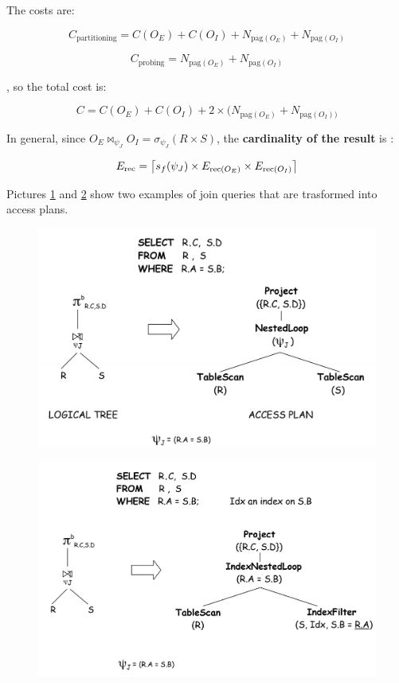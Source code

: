 \begin{itemize}
\begin{itemize}
    \end{itemize}

    The costs are:

    $$
    C_{\text{partitioning}} = C(O_E) + C(O_I) + N_{\text{pag}(O_E)} + N_{\text{pag}(O_I)}
    $$

    $$
    C_{\text{probing}} = N_{\text{pag}(O_E)} + N_{\text{pag}(O_I)}
    $$

    , so the total cost is:

    $$
    C = C(O_E) + C(O_I) + 2 \times (N_{\text{pag}(O_E)} + N_{\text{pag}(O_I))}
    $$
    
\end{itemize}

In general, since $O_E \bowtie_{\psi_J} O_I = \sigma_{\psi_J}(R \times S)$, the \textbf{cardinality of the result} is :

$$
E_{\text{rec}} = \ceil*{s_f(\psi_J) \times E_{\text{rec}(O_E)} \times E_{\text{rec} (O_I) }  }
$$

Pictures \ref{relop12} and \ref{relop13} show two examples of join queries that are trasformed into access plans.

\begin{figure}[h!]
		\centering
		\includegraphics[scale = 0.7]{img/relop12.jpg}
		\label{relop12}
\end{figure}


\begin{figure}[h!]
		\centering
		\includegraphics[scale = 0.7]{img/relop13.jpg}
		\label{relop13}
\end{figure}

